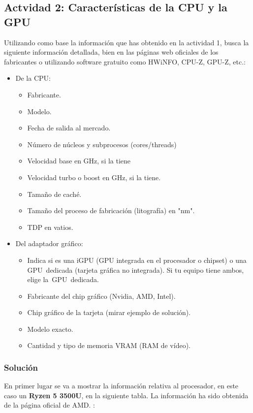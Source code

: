 \subsection{Actvidad 2: Características de la CPU y la GPU}
Utilizando como base la información que has obtenido en la actividad 1, busca la siguiente información detallada, bien en las páginas web oficiales de los fabricantes o utilizando software gratuito como HWiNFO, CPU-Z, GPU-Z, etc.:

\begin{itemize}
    \item De la CPU:
    \begin{itemize}
        \item Fabricante.
        \item Modelo.
        \item Fecha de salida al mercado.
        \item Número de núcleos y subprocesos (cores/threads)
        \item Velocidad base en GHz, si la tiene
        \item Velocidad turbo o boost en GHz, si la tiene.
        \item Tamaño de caché.
        \item Tamaño del proceso de fabricación (litografía) en "nm".
        \item  TDP en vatios.
    \end{itemize}
    \item Del adaptador gráfico:
    \begin{itemize}
        \item Indica si es una iGPU (GPU integrada en el procesador o chipset) o una GPU dedicada (tarjeta gráfica no integrada). Si tu equipo tiene ambos, elige la GPU dedicada.
        \item Fabricante del chip gráfico (Nvidia, AMD, Intel).
        \item Chip gráfico de la tarjeta (mirar ejemplo de solución).
        \item Modelo exacto.
        \item Cantidad y tipo de memoria VRAM (RAM de vídeo).
    \end{itemize}
\end{itemize}

\subsubsection{Solución}

En primer lugar se va a mostrar la información relativa al procesador, en este caso un \textbf{Ryzen 5 3500U}, en la siguiente tabla. La información ha sido obtenida de la página oficial de AMD. \cite{amd01}:

